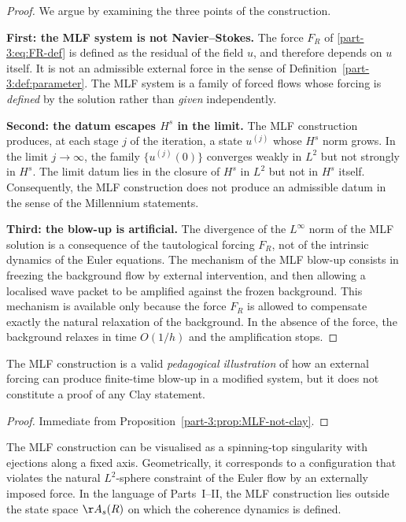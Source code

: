 \begin{proof}
We argue by examining the three points of the construction.

\textbf{First: the MLF system is not Navier--Stokes.} The force 
$F_R$ of \eqref{part-3:eq:FR-def} is defined as the residual of the field 
$u$, and therefore depends on $u$ itself. It is not an admissible 
external force in the sense of Definition~\ref{part-3:def:parameter}. The 
MLF system is a family of forced flows whose forcing is 
\emph{defined} by the solution rather than \emph{given} independently.

\textbf{Second: the datum escapes $H^s$ in the limit.} The MLF 
construction produces, at each stage $j$ of the iteration, a state 
$u^{(j)}$ whose $H^s$ norm grows. In the limit $j\to\infty$, the 
family $\{u^{(j)}(0)\}$ converges weakly in $L^2$ but not strongly 
in $H^s$. The limit datum lies in the closure of $H^s$ in $L^2$ but 
not in $H^s$ itself. Consequently, the MLF construction does not 
produce an admissible datum in the sense of the Millennium 
statements.

\textbf{Third: the blow-up is artificial.} The divergence of the 
$L^\infty$ norm of the MLF solution is a consequence of the 
tautological forcing $F_R$, not of the intrinsic dynamics of the 
Euler equations. The mechanism of the MLF blow-up consists in 
freezing the background flow by external intervention, and then 
allowing a localised wave packet to be amplified against the frozen 
background. This mechanism is available only because the force $F_R$ 
is allowed to compensate exactly the natural relaxation of the 
background. In the absence of the force, the background relaxes in 
time $O(1/h)$ and the amplification stops.
\end{proof}

\begin{corollary}\label{part-3:cor:MLF-pedagogical}
The MLF construction is a valid \emph{pedagogical illustration} of 
how an external forcing can produce finite-time blow-up in a 
modified system, but it does not constitute a proof of any Clay 
statement.
\end{corollary}

\begin{proof}
Immediate from Proposition~\ref{part-3:prop:MLF-not-clay}.
\end{proof}

\begin{remark}\label{part-3:rem:quasar}
The MLF construction can be visualised as a spinning-top singularity 
with ejections along a fixed axis. Geometrically, it corresponds to a 
configuration that violates the natural $L^2$-sphere constraint of 
the Euler flow by an externally imposed force. In the language of 
Parts~I--II, the MLF construction lies outside the state space 
$\AA_s(R)$ on which the coherence dynamics is defined.
\end{remark}

